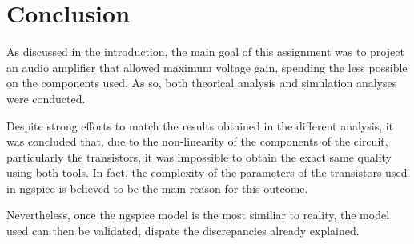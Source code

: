 \pagebreak
\section{Conclusion}
\label{con}

\par As discussed in the introduction, the main goal of this assignment was to project an audio amplifier that allowed maximum voltage gain, spending the less possible on the components used. As so, both theorical analysis and simulation analyses were conducted. 

\par Despite strong efforts to match the results obtained in the different analysis, it was concluded that, due to the non-linearity of the components of the circuit, particularly the transistors, it was impossible to obtain the exact same quality using both tools. In fact, the complexity of the parameters of the transistors used in ngspice is believed to be the main reason for this outcome.

\par Nevertheless, once the ngspice model is the most similiar to reality, the model used can then be validated, dispate the discrepancies already explained.

